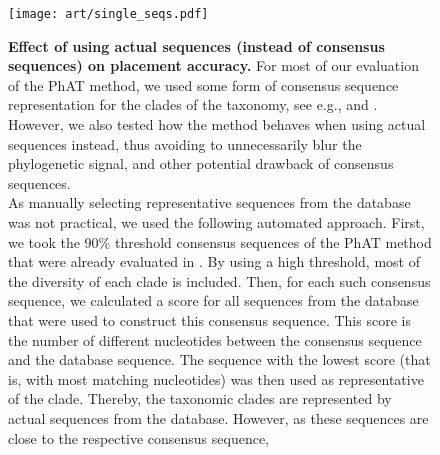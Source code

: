 \begin{figure}[hpbt]
    \centering
    \texttt{[image: art/single\_seqs.pdf]}
    \begin{subfigure}{0pt}
        \label{fig:single_seqs:sub:majorities_edge}
    \end{subfigure}
    \begin{subfigure}{0pt}
        \label{fig:single_seqs:sub:single_seq_edge}
    \end{subfigure}
    \begin{subfigure}{0pt}
        \label{fig:single_seqs:sub:majorities_branch}
    \end{subfigure}
    \begin{subfigure}{0pt}
        \label{fig:single_seqs:sub:single_seq_branch}
    \end{subfigure}
    \caption[Effect of using actual sequences (instead of consensus sequences) on placement accuracy]{
        \textbf{Effect of using actual sequences (instead of consensus sequences) on placement accuracy.}
        For most of our evaluation of the \ac{PhAT} method,
        we used some form of consensus sequence representation for the clades of the taxonomy,
        see e.g.,  and .
        However, we also tested how the method behaves when using actual sequences instead,
        thus avoiding to unnecessarily blur the phylogenetic signal,
        and other potential drawback of consensus sequences.
        \\
        As manually selecting representative sequences from the database was not practical,
        we used the following automated approach.
        First, we took the 90\% threshold consensus sequences of the \ac{PhAT} method
        that were already evaluated in .
        By using a high threshold, most of the diversity of each clade is included.
        Then, for each such consensus sequence,
        we calculated a score for all sequences from the database that were used to construct this consensus sequence.
        This score is the number of different nucleotides between the consensus sequence and the database sequence.
        The sequence with the lowest score (that is, with most matching nucleotides)
        was then used as representative of the clade.
        Thereby, the taxonomic clades are represented by actual sequences from the database.
        However, as these sequences are close to the respective consensus sequence,
}
\end{figure}
